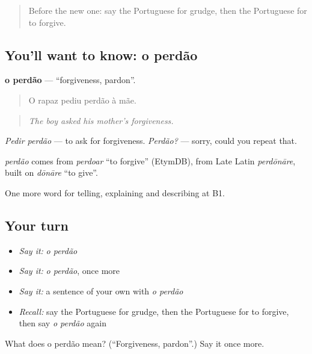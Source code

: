 \label{lesson:PT-C479-perdao}



\begin{quote}
Before the new one: say the Portuguese for grudge, then the Portuguese for to forgive.
\end{quote}

\subsection*{You'll want to know: o perdão}
\textbf{o perdão} — \textquotedblleft{}forgiveness, pardon\textquotedblright{}.

\begin{quote}
O rapaz pediu perdão à mãe.
\end{quote}

\begin{quote}
\emph{The boy asked his mother's forgiveness.}
\end{quote}

\emph{Pedir perdão} — to ask for forgiveness. \emph{Perdão?} — sorry, could you repeat that.

\begin{cousinweb}
\emph{perdão} comes from \emph{perdoar} \textquotedblleft{}to forgive\textquotedblright{} (EtymDB), from Late Latin \emph{perdōnāre}, built on \emph{dōnāre} \textquotedblleft{}to give\textquotedblright{}.
\end{cousinweb}

\begin{grammarlens}[title={What you've built}]
One more word for telling, explaining and describing at B1.
\end{grammarlens}

\subsection*{Your turn}
\begin{itemize}
\raggedright
  \item \emph{Say it:} \emph{o perdão}
  \item \emph{Say it:} \emph{o perdão}, once more
  \item \emph{Say it:} a sentence of your own with \emph{o perdão}
  \item \emph{Recall:} say the Portuguese for grudge, then the Portuguese for to forgive, then say \emph{o perdão} again
\end{itemize}

\begin{tcolorbox}[breakable,colback=teal!4,colframe=teal!35!black,title={Before you move on}]
What does o perdão mean? (\textquotedblleft{}Forgiveness, pardon\textquotedblright{}.) Say it once more.
\end{tcolorbox}
